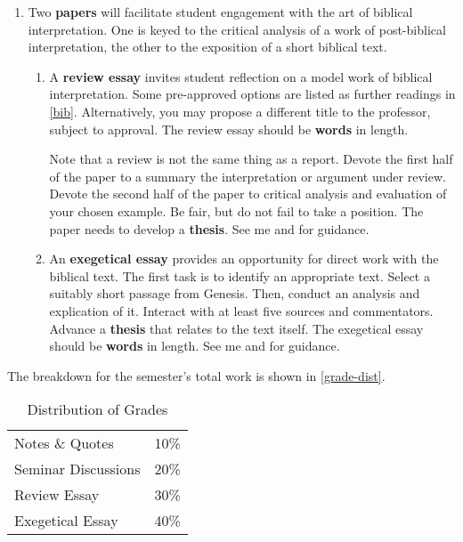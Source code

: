 \documentclass[titlepage]{article}
\begin{document}
\begin{enumerate}
\begin{enumerate}
	\end{enumerate}

	\item Two \textbf{papers} will facilitate student engagement with the
	art of biblical interpretation. One is keyed to the critical analysis of
	a work of post-biblical interpretation, the other to the exposition of a
	short biblical text.

	\begin{enumerate}

		\item A \textbf{review essay} invites student reflection on a
		model work of biblical interpretation. Some pre-approved options
		are listed as further readings in \autoref{bib}. Alternatively,
		you may propose a different title to the professor, subject to
		approval. The review essay should be \textbf{
		words} in length.

		Note that a review is not the same thing as a report. Devote the
		first half of the paper to a summary the interpretation or argument
		under review. Devote the second half of the paper to critical
		analysis and evaluation of your chosen example. Be fair, but do not
		fail to take a position. The paper needs to develop a
		\textbf{thesis}. See me and \cite[chs 3, 5–7, 11]{rlgs} for
		guidance.

		\item An \textbf{exegetical essay} provides an opportunity for
		direct work with the biblical text. The first task is to
		identify an appropriate text. Select a suitably short passage
		from Genesis. Then, conduct an analysis and explication of it.
		Interact with at least five sources and commentators. Advance a
		\textbf{thesis} that relates to the text itself. The exegetical
		essay should be \textbf{ words} in length. See
		me and \cite[chs 3, 5, 8, 11]{rlgs} for guidance.

	\end{enumerate}

\end{enumerate}

The breakdown for the semester's total work is shown in
\autoref{grade-dist}.

\begin{table}[htbp]
  \centering
  {\lining
  \begin{tabular}{lr}
    \toprule
    Notes \& Quotes     & 10\% \\
    Seminar Discussions & 20\% \\
    Review Essay        & 30\% \\
    Exegetical Essay    & 40\% \\
    \bottomrule
  \end{tabular}}
  \caption{Distribution of Grades}
  \label{grade-dist}
\end{table}
\end{document}
